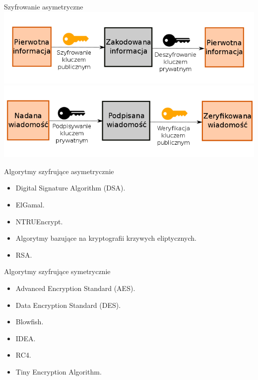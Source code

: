 \begin{frame}{Szyfrowanie asymetryczne}
		\includegraphics[height=0.25\paperwidth]{images/pub-key.png} \\
		\includegraphics[height=0.25\paperwidth]{images/pub-key-sign.png}
\end{frame}

\begin{frame}{Algorytmy szyfrujące asymetrycznie}
	\begin{itemize}
		\item Digital Signature Algorithm (DSA).
		\item ElGamal.
		\item NTRUEncrypt.
		\item Algorytmy bazujące na kryptografii krzywych eliptycznych.
		\item RSA.
	\end{itemize}
\end{frame}

\begin{frame}{Algorytmy szyfrujące symetrycznie}
	\begin{itemize}
		\item Advanced Encryption Standard (AES).
		\item Data Encryption Standard (DES).
		\item Blowfish.
		\item IDEA.
		\item RC4.
		\item Tiny Encryption Algorithm.
	\end{itemize}
\end{frame}

